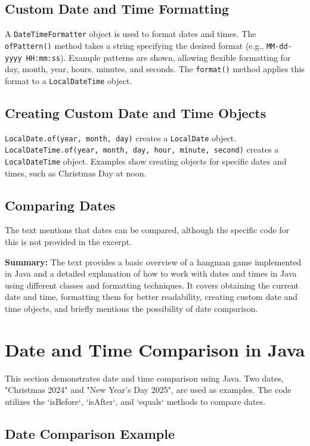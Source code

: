 \documentclass{article}
\begin{document}
\begin{itemize}
\subsection{Custom Date and Time Formatting}

A \texttt{DateTimeFormatter} object is used to format dates and times.  The \texttt{ofPattern()} method takes a string specifying the desired format (e.g., \texttt{MM-dd-yyyy HH:mm:ss}).  Example patterns are shown, allowing flexible formatting for day, month, year, hours, minutes, and seconds.  The \texttt{format()} method applies this format to a \texttt{LocalDateTime} object.

\subsection{Creating Custom Date and Time Objects}

\texttt{LocalDate.of(year, month, day)} creates a \texttt{LocalDate} object.  \texttt{LocalDateTime.of(year, month, day, hour, minute, second)} creates a \texttt{LocalDateTime} object.  Examples show creating objects for specific dates and times, such as Christmas Day at noon.

\subsection{Comparing Dates}

The text mentions that dates can be compared, although the specific code for this is not provided in the excerpt.


\textbf{Summary:} The text provides a basic overview of a hangman game implemented in Java and a detailed explanation of how to work with dates and times in Java using different classes and formatting techniques.  It covers obtaining the current date and time, formatting them for better readability, creating custom date and time objects, and briefly mentions the possibility of date comparison.


\section{Date and Time Comparison in Java}

This section demonstrates date and time comparison using Java.  Two dates, "Christmas 2024" and "New Year's Day 2025", are used as examples.  The code utilizes the `isBefore`, `isAfter`, and `equals` methods to compare dates.

\subsection{Date Comparison Example}


\end{itemize}
\end{document}
